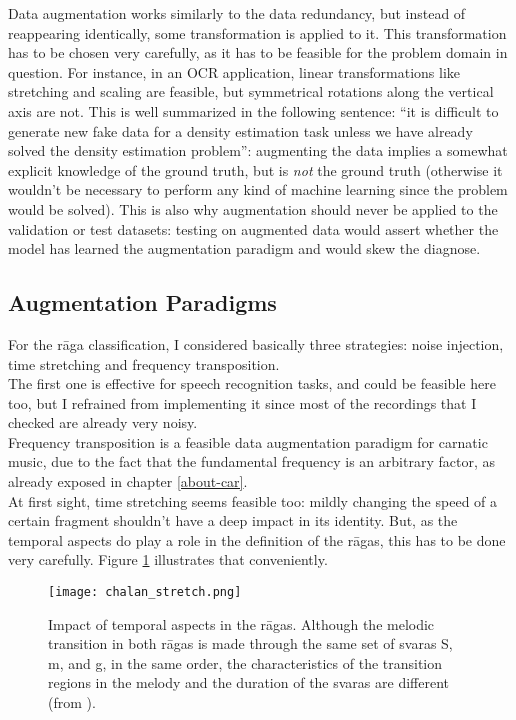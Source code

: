   Data augmentation works similarly to the data redundancy, but instead of reappearing identically, some transformation is applied to it. This transformation has to be chosen very carefully, as it has to be feasible for the problem domain in question. For instance, in an OCR application, linear transformations like stretching and scaling are feasible, but symmetrical rotations along the vertical axis are not.  This is well summarized in the following sentence: ``it is difficult to generate new fake data for a density estimation task unless we have already solved the density estimation problem''\cite[p.240]{goodfellow}: augmenting the data implies a somewhat explicit knowledge of the ground truth, but is {\it not} the ground truth (otherwise it wouldn't be necessary to perform any kind of machine learning since the problem would be solved). This is also why augmentation should never be applied to the validation or test datasets: testing on augmented data would assert whether the model has learned the augmentation paradigm and would skew the diagnose.

  \subsection{Augmentation Paradigms}

  For the r\=aga classification, I considered basically three strategies: noise injection, time stretching and frequency transposition.\\

  The first one is effective for speech recognition tasks\cite[p.241]{goodfellow}, and could be feasible here too, but I refrained from implementing it since most of the recordings that I checked are already very noisy.\\

  Frequency transposition is a feasible data augmentation paradigm for carnatic music, due to the fact that the fundamental frequency is an arbitrary factor, as already exposed in chapter \ref{about-car}.\\

  At first sight, time stretching seems feasible too: mildly changing the speed of a certain fragment shouldn't have a deep impact in its identity. But, as the temporal aspects do play a role in the definition of the r\=agas, this has to be done very carefully. Figure \ref{fig:chalan-stretch} illustrates that conveniently.

  \begin{figure}[h]
    \centering
    \texttt{[image: chalan\_stretch.png]}
    \caption{Impact of temporal aspects in the r\=agas. Although the melodic transition in both r\=agas is made through the same set of svaras S, m, and g, in the same order, the characteristics of the transition regions in the melody and the duration of the svaras are different (from \cite[p.22]{gulati}).}
    \label{fig:chalan-stretch}
  \end{figure}


